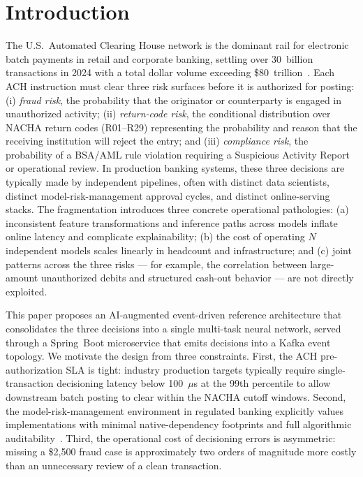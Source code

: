 \documentclass[11pt,a4paper]{article}
\begin{document}
\section{Introduction}
\label{sec:intro}

The U.S.\ Automated Clearing House network is the dominant rail for
electronic batch payments in retail and corporate banking, settling over
30~billion transactions in 2024 with a total dollar volume exceeding
\$80~trillion~\cite{nacha2024}. Each ACH instruction must clear three risk
surfaces before it is authorized for posting: (i) \textit{fraud risk}, the
probability that the originator or counterparty is engaged in unauthorized
activity; (ii) \textit{return-code risk}, the conditional distribution over
NACHA return codes (R01--R29) representing the probability and reason that the
receiving institution will reject the entry; and (iii) \textit{compliance
risk}, the probability of a BSA/AML rule violation requiring a Suspicious
Activity Report or operational review. In production banking systems, these
three decisions are typically made by independent pipelines, often with
distinct data scientists, distinct model-risk-management approval cycles, and
distinct online-serving stacks. The fragmentation introduces three concrete
operational pathologies: (a) inconsistent feature transformations and
inference paths across models inflate online latency and complicate
explainability; (b) the cost of operating $N$ independent models scales
linearly in headcount and infrastructure; and (c) joint patterns across the
three risks --- for example, the correlation between large-amount unauthorized
debits and structured cash-out behavior --- are not directly exploited.

This paper proposes an AI-augmented event-driven reference architecture that
consolidates the three decisions into a single multi-task neural network,
served through a Spring~Boot microservice that emits decisions into a Kafka
event topology. We motivate the design from three constraints. First, the
ACH pre-authorization SLA is tight: industry production targets typically
require single-transaction decisioning latency below 100~$\mu$s at the
99th percentile to allow downstream batch posting to clear within the NACHA
cutoff windows. Second, the model-risk-management environment in regulated
banking explicitly values implementations with minimal native-dependency
footprints and full algorithmic auditability~\cite{ocg2017,fed2011}. Third,
the operational cost of decisioning errors is asymmetric: missing a
\$2{,}500 fraud case is approximately two orders of magnitude more costly
than an unnecessary review of a clean transaction.
\end{document}
